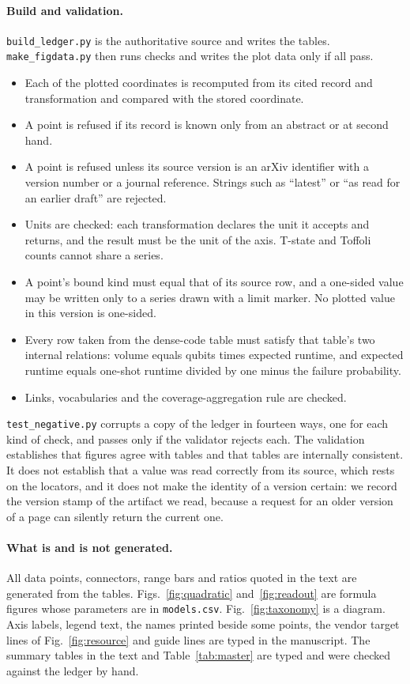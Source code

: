 \paragraph{Build and validation.} \texttt{build\_ledger.py} is the authoritative source and writes the tables. \texttt{make\_figdata.py} then runs \nChecks{} checks and writes the plot data only if all pass.
\begin{itemize}
\item Each of the \nCoords{} plotted coordinates is recomputed from its cited record and transformation and compared with the stored coordinate.
\item A point is refused if its record is known only from an abstract or at second hand.
\item A point is refused unless its source version is an arXiv identifier with a version number or a journal reference. Strings such as ``latest'' or ``as read for an earlier draft'' are rejected.
\item Units are checked: each transformation declares the unit it accepts and returns, and the result must be the unit of the axis. T-state and Toffoli counts cannot share a series.
\item A point's bound kind must equal that of its source row, and a one-sided value may be written only to a series drawn with a limit marker. No plotted value in this version is one-sided.
\item Every row taken from the dense-code table must satisfy that table's two internal relations: volume equals qubits times expected runtime, and expected runtime equals one-shot runtime divided by one minus the failure probability.
\item Links, vocabularies and the coverage-aggregation rule are checked.
\end{itemize}
\texttt{test\_negative.py} corrupts a copy of the ledger in fourteen ways, one for each kind of check, and passes only if the validator rejects each. The validation establishes that figures agree with tables and that tables are internally consistent. It does not establish that a value was read correctly from its source, which rests on the locators, and it does not make the identity of a version certain: we record the version stamp of the artifact we read, because a request for an older version of a page can silently return the current one.

\paragraph{What is and is not generated.} All data points, connectors, range bars and ratios quoted in the text are generated from the tables. Figs.~\ref{fig:quadratic} and~\ref{fig:readout} are formula figures whose parameters are in \texttt{models.csv}. Fig.~\ref{fig:taxonomy} is a diagram. Axis labels, legend text, the names printed beside some points, the vendor target lines of Fig.~\ref{fig:resource} and guide lines are typed in the manuscript. The summary tables in the text and Table~\ref{tab:master} are typed and were checked against the ledger by hand.

